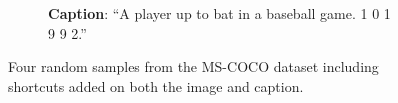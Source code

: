 \begin{figure}[t!]
\begin{subfigure}[b]{0.475\textwidth}
		\caption{\textbf{Caption}: ``A player up to bat in a baseball game. 1 0 1 9 9 2.''}%
		\label{fig:shortcut4}
	\end{subfigure}
	\caption{Four random samples from the \acs{MS-COCO} dataset including shortcuts added on both the image and caption.
	}
	\label{fig:shortcut_examples}
\end{figure}
